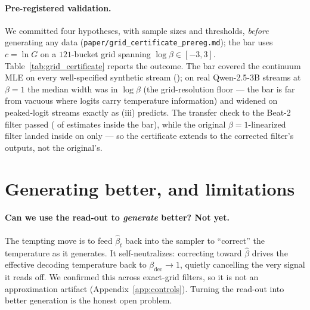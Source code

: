 \documentclass[11pt]{article}
\newcommand{\tabdir}{../results/tables}
\begin{document}
\paragraph{Pre-registered validation.}
We committed four hypotheses, with sample sizes and thresholds, \emph{before}
generating any data (\texttt{paper/grid\_certificate\_prereg.md}); the bar uses
$c=\ln G$ on a $121$-bucket grid spanning $\log\beta\in[-3,3]$.
Table~\ref{tab:grid_certificate} reports the outcome. The bar covered the
continuum MLE on every well-specified synthetic stream (\gridCertCoverage); on
real Qwen-2.5-3B streams at $\beta{=}1$ the median width was
\gridCertMedianWidthBtOne{} in $\log\beta$ (the grid-resolution floor --- the bar
is far from vacuous where logits carry temperature information) and widened on
peaked-logit streams exactly as (iii) predicts. The transfer check to the Beat-2
filter passed (\gridCertFaithfulAgree{} of estimates inside the bar), while the
original $\beta{=}1$-linearized filter landed inside on only
\gridCertOriginalAgree{} --- so the certificate extends to the corrected filter's
outputs, not the original's.

\begin{table}[t]
\centering

\caption{Pre-registered evaluation of the certificate (hypotheses, sample sizes,
and thresholds committed before any data were generated). Real streams are
Qwen-2.5-3B, $32$ prompts, $1000$ tokens.}
\label{tab:grid_certificate}
\end{table}

\section{Generating better, and limitations}\label{sec:gen}
\paragraph{Can we use the read-out to \emph{generate} better? Not yet.}
The tempting move is to feed $\hat\beta_t$ back into the sampler to ``correct''
the temperature as it generates. It self-neutralizes: correcting toward
$\hat\beta$ drives the effective decoding temperature back to
$\beta_{\mathrm{dec}}\to 1$, quietly cancelling the very signal it reads off. We
confirmed this across exact-grid filters, so it is not an approximation artifact
(Appendix~\ref{app:controls}). Turning the read-out into better generation is the
honest open problem.
\end{document}
